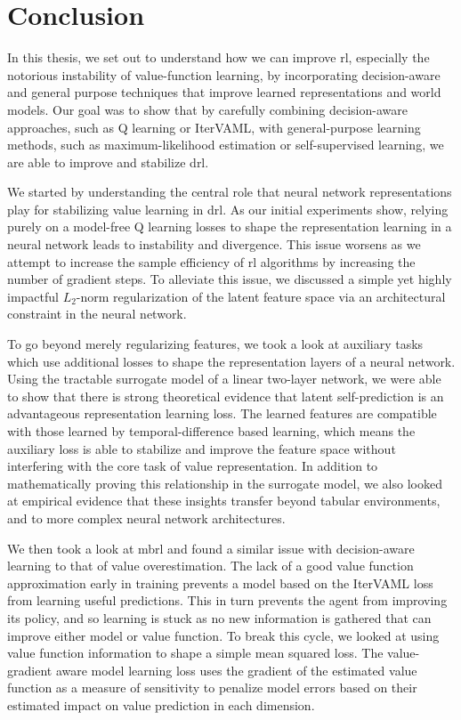 \chapter{Conclusion}
\label{chap:conclusion}

In this thesis, we set out to understand how we can improve \ac{rl}, especially the notorious instability of value-function learning, by incorporating decision-aware and general purpose techniques that improve learned representations and world models.
Our goal was to show that by carefully combining decision-aware approaches, such as Q learning or IterVAML, with general-purpose learning methods, such as maximum-likelihood estimation or self-supervised learning, we are able to improve and stabilize \ac{drl}.

We started by understanding the central role that neural network representations play for stabilizing value learning in \ac{drl}.
As our initial experiments show, relying purely on a model-free Q learning losses to shape the representation learning in a neural network leads to instability and divergence.
This issue worsens as we attempt to increase the sample efficiency of \ac{rl} algorithms by increasing the number of gradient steps.
To alleviate this issue, we discussed a simple yet highly impactful $L_2$-norm regularization of the latent feature space via an architectural constraint in the neural network.

To go beyond merely regularizing features, we took a look at auxiliary tasks which use additional losses to shape the representation layers of a neural network.
Using the tractable surrogate model of a linear two-layer network, we were able to show that there is strong theoretical evidence that latent self-prediction is an advantageous representation learning loss.
The learned features are compatible with those learned by temporal-difference based learning, which means the auxiliary loss is able to stabilize and improve the feature space without interfering with the core task of value representation.
In addition to mathematically proving this relationship in the surrogate model, we also looked at empirical evidence that these insights transfer beyond tabular environments, and to more complex neural network architectures.

We then took a look at \ac{mbrl} and found a similar issue with decision-aware learning to that of value overestimation.
The lack of a good value function approximation early in training prevents a model based on the IterVAML loss from learning useful predictions.
This in turn prevents the agent from improving its policy, and so learning is stuck as no new information is gathered that can improve either model or value function.
To break this cycle, we looked at using value function information to shape a simple mean squared loss.
The value-gradient aware model learning loss uses the gradient of the estimated value function as a measure of sensitivity to penalize model errors based on their estimated impact on value prediction in each dimension.

